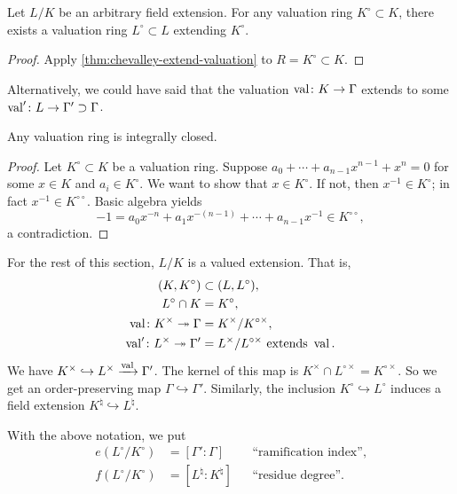 \begin{corollary}
Let $L/K$ be an arbitrary field extension. For any valuation ring 
$K^\circ\subset K$, there exists a valuation ring $L^\circ\subset L$ extending 
$K^\circ$. 
\end{corollary}
\begin{proof}
Apply \autoref{thm:chevalley-extend-valuation} to $R=K^\circ\subset K$. 
\end{proof}

Alternatively, we could have said that the valuation 
$\operatorname{val}\colon K\to \Gamma$ extends to some 
$\operatorname{val}'\colon L\to \Gamma'\supset \Gamma$. 

\begin{lemma}
Any valuation ring is integrally closed. 
\end{lemma}
\begin{proof}
Let $K^\circ\subset K$ be a valuation ring. Suppose 
$a_0+\cdots + a_{n-1} x^{n-1} + x^n = 0$ for some $x\in K$ and 
$a_i\in K^\circ$. We want to show that $x\in K^\circ$. If not, then 
$x^{-1}\in K^\circ$; in fact $x^{-1}\in K^{\circ\circ}$. Basic algebra 
yields 
\[
  -1 = a_0 x^{-n} + a_1 x^{-(n-1)} + \cdots + a_{n-1} x^{-1} \in K^{\circ\circ} ,
\]
a contradiction. 
\end{proof}

For the rest of this section, $L/K$ is a valued extension. That is, 
\begin{align*}
  (K,K^\circ) &\subset (L,L^\circ) ,\\
  L^\circ\cap K &= K^\circ ,\\
  \operatorname{val} \colon K^\times \twoheadrightarrow \Gamma &=K^\times/K^{\circ\times} ,\\
  \operatorname{val}' \colon L^\times \twoheadrightarrow \Gamma' &= L^\times/L^{\circ\times} \text{ extends }\operatorname{val} .
\end{align*}
We have $K^\times \hookrightarrow L^\times \xrightarrow{\operatorname{val}} \Gamma'$. 
The kernel of this map is $K^\times\cap L^{\circ\times} = K^{\circ\times}$. So 
we get an order-preserving map $\Gamma\hookrightarrow \Gamma'$. Similarly, the 
inclusion $K^\circ\hookrightarrow L^\circ$ induces a field extension 
$K^\natural\hookrightarrow L^\natural$. 

\begin{definition}
With the above notation, we put 
\begin{align*}
  e(L^\circ/K^\circ) &= [\Gamma'\colon \Gamma] && \text{``ramification index''} , \\
  f(L^\circ/K^\circ) &= [L^\natural\colon K^\natural] && \text{``residue degree''} .
\end{align*}
\end{definition}

